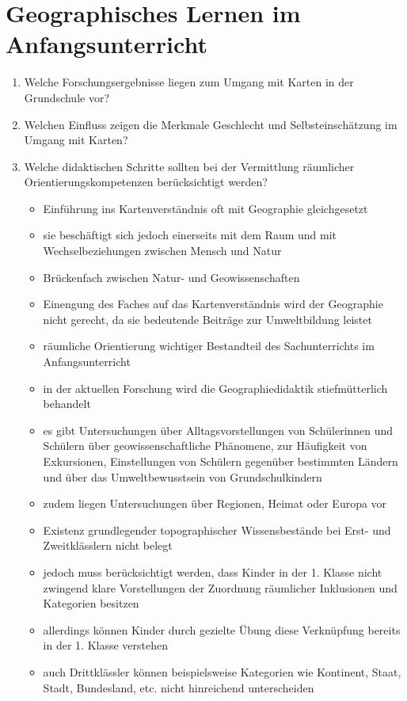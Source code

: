 \section{Geographisches Lernen im Anfangsunterricht}{\cite{IH07}
\begin{enumerate}
	\item{Welche Forschungsergebnisse liegen zum Umgang mit Karten in der Grundschule vor?}
	\item{Welchen Einfluss zeigen die Merkmale \glqq Geschlecht\grqq{} und \glqq Selbsteinschätzung\grqq{} im Umgang mit Karten?}
	\item{
		Welche didaktischen Schritte sollten bei der Vermittlung räumlicher Orientierungskompetenzen berücksichtigt werden?
		\begin{itemize}
			\item{Einführung ins Kartenverständnis oft mit Geographie gleichgesetzt}
			\item{sie beschäftigt sich jedoch einerseits mit dem Raum und mit Wechselbeziehungen zwischen Mensch und Natur}
			\item{Brückenfach zwischen Natur- und Geowissenschaften}
			\item{Einengung des Faches auf das Kartenverständnis wird der Geographie nicht gerecht, da sie bedeutende Beiträge zur Umweltbildung leistet}
			\item{räumliche Orientierung wichtiger Bestandteil des Sachunterrichts im Anfangsunterricht}
			\item{in der aktuellen Forschung wird die Geographiedidaktik stiefmütterlich behandelt}
			\item{es gibt Untersuchungen über Alltagsvorstellungen von Schülerinnen und Schülern über geowissenschaftliche Phänomene, zur Häufigkeit von Exkursionen, Einstellungen von Schülern gegenüber bestimmten Ländern und über das Umweltbewusstsein von Grundschulkindern}
			\item{zudem liegen Untersuchungen über Regionen, Heimat oder Europa vor}
			\item{Existenz grundlegender topographischer Wissensbestände bei Erst- und Zweitklässlern nicht belegt}
			\item{jedoch muss berücksichtigt werden, dass Kinder in der 1. Klasse nicht zwingend klare Vorstellungen der Zuordnung räumlicher Inklusionen und Kategorien besitzen}
			\item{allerdings können Kinder durch gezielte Übung diese Verknüpfung bereits in der 1. Klasse verstehen}
			\item{auch Drittklässler können beispielsweise Kategorien wie Kontinent, Staat, Stadt, Bundesland, etc. nicht hinreichend unterscheiden}

\end{itemize}}
\end{enumerate}}

